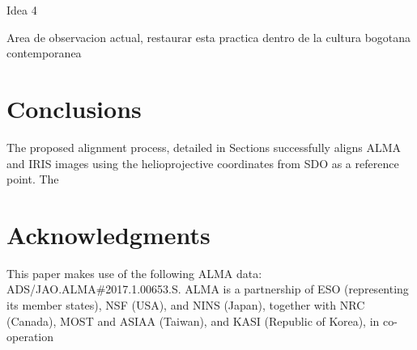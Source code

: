 \documentclass[a4paper,alpha-refs]{eSpectra}
\begin{document}
Idea 4 

Area de observacion actual, restaurar esta practica dentro de la  cultura bogotana contemporanea

\section{Conclusions}
The proposed alignment process, detailed in   Sections
successfully aligns ALMA and IRIS images using the helioprojective coordinates from SDO as a reference point. The 


\section*{Acknowledgments}
This paper makes use of the following ALMA data: ADS/JAO.ALMA\#2017.1.00653.S. ALMA is a partnership of ESO (representing its member states), NSF (USA), and NINS (Japan), together with NRC (Canada), MOST and ASIAA (Taiwan), and KASI (Republic of Korea), in co-operation 





\end{document}
